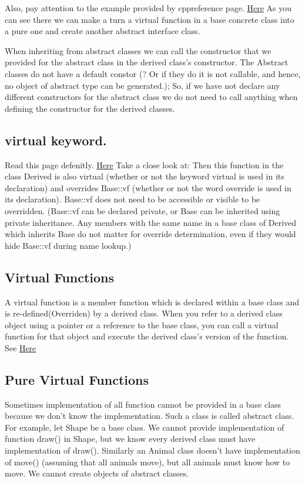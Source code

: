 \documentclass[11pt,twoside,a4paper]{report}
\begin{document}
Also, pay attention to the example provided by cppreference page. \href{https://en.cppreference.com/w/cpp/language/abstract_class}{Here}
As you can see there we can make a turn a virtual function in a base concrete class into a pure one and create another abstract interface class.

When inheriting from abstract classes we can call the constructor that we provided for the abstract class in the derived class's constructor. 
The Abstract classes do not have a default constor (? Or if they do it is not callable, and hence, no object of abstract type can be generated.); So, if we have not declare any different constructors for the abstract class we do not need to call anything when defining the constructor for the derived classes.
\subsection{virtual keyword.}
Read this page defenitly. \href{https://en.cppreference.com/w/cpp/language/virtual}{Here}
Take a close look at: Then this function in the class Derived is also virtual (whether or not the keyword virtual is used in its declaration) and overrides Base::vf (whether or not the word override is used in its declaration).
Base::vf does not need to be accessible or visible to be overridden. (Base::vf can be declared private, or Base can be inherited using private inheritance. Any members with the same name in a base class of Derived which inherits Base do not matter for override determination, even if they would hide Base::vf during name lookup.) 

\subsection{Virtual Functions}
A virtual function is a member function which is declared within a base class and is re-defined(Overriden)
by a derived class. When you refer to a derived class object using a pointer or a reference to the base class,
you can call a virtual function for that object and execute the derived class’s version of the function.
See \href{https://www.geeksforgeeks.org/virtual-function-cpp/}{Here}

\subsection{Pure Virtual Functions}
Sometimes implementation of all function cannot be provided in a base class because we don’t know the implementation. Such a class is called abstract class. For example, let Shape be a base class. We cannot provide implementation of function draw() in Shape, but we know every derived class must have implementation of draw(). Similarly an Animal class doesn’t have implementation of move() (assuming that all animals move), but all animals must know how to move. We cannot create objects of abstract classes.
\end{document}

